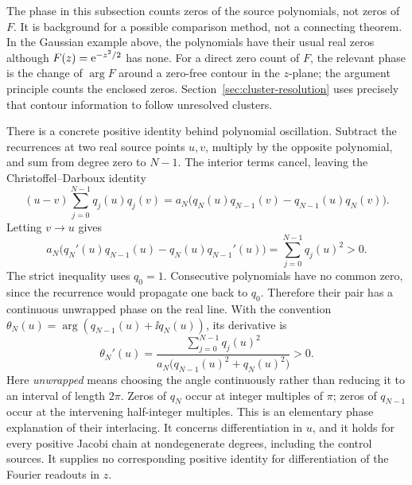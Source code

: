 The phase in this subsection counts zeros of the source polynomials,
not zeros of \(F\). It is background for a possible comparison method,
not a connecting theorem. In the Gaussian example above, the polynomials
have their usual real zeros although \(F(z)=\mathrm e^{-z^2/2}\) has none.
For a direct zero count of \(F\), the relevant phase is the change of
\(\arg F\) around a zero-free contour in the \(z\)-plane; the argument
principle counts the enclosed zeros. Section~\ref{sec:cluster-resolution}
uses precisely that contour information to follow unresolved clusters.

There is a concrete positive identity behind polynomial oscillation.
Subtract the recurrences at two real source points \(u,v\), multiply
by the opposite polynomial, and sum from degree zero to \(N-1\).
The interior terms cancel, leaving the Christoffel--Darboux identity
\begin{equation}
 (u-v)\sum_{j=0}^{N-1}q_j(u)q_j(v)
 =a_N\bigl(q_N(u)q_{N-1}(v)-q_{N-1}(u)q_N(v)\bigr).
 \label{eq:christoffel-darboux}
\end{equation}
Letting \(v\to u\) gives
\begin{equation}
 a_N\bigl(q_N'(u)q_{N-1}(u)-q_N(u)q_{N-1}'(u)\bigr)
       =\sum_{j=0}^{N-1}q_j(u)^2>0.
 \label{eq:polynomial-wronskian}
\end{equation}
The strict inequality uses \(q_0=1\). Consecutive polynomials
have no common zero, since the recurrence would propagate one
back to \(q_0\). Therefore their pair has a continuous unwrapped
phase on the real line. With the convention
\(\theta_N(u)=\arg(q_{N-1}(u)+\ii q_N(u))\), its derivative is
\begin{equation}
 \theta_N'(u)=
 \frac{\sum_{j=0}^{N-1}q_j(u)^2}
 {a_N\bigl(q_{N-1}(u)^2+q_N(u)^2\bigr)}>0.
 \label{eq:polynomial-phase}
\end{equation}
Here \emph{unwrapped} means choosing the angle continuously rather
than reducing it to an interval of length \(2\pi\).
Zeros of \(q_N\) occur at integer multiples of \(\pi\);
zeros of \(q_{N-1}\) occur at the intervening half-integer multiples.
This is an elementary phase explanation of their interlacing.
It concerns differentiation in \(u\), and it holds for every
positive Jacobi chain at nondegenerate degrees, including the
control sources. It supplies no corresponding positive identity
for differentiation of the Fourier readouts in \(z\).

